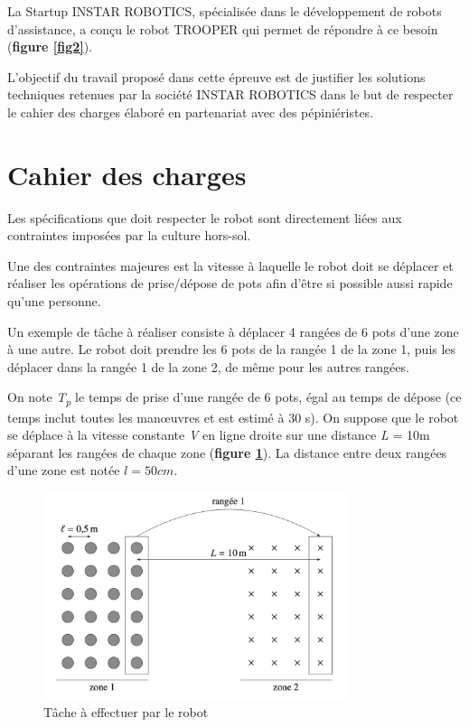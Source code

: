 La Startup INSTAR ROBOTICS, spécialisée dans le développement de robots
d'assistance, a conçu le robot TROOPER qui permet de répondre à ce
besoin (\textbf{figure \ref{fig2}}).

L'objectif du travail proposé dans cette épreuve est de justifier les
solutions techniques retenues par la société INSTAR ROBOTICS dans le but
de respecter le cahier des charges élaboré en partenariat avec des
pépiniéristes.

\section{Cahier des charges}\label{partie-ii---cahier-des-charges}


Les spécifications que doit respecter le robot sont directement liées
aux contraintes imposées par la culture hors-sol.

Une des contraintes majeures est la vitesse à laquelle le robot doit se
déplacer et réaliser les opérations de prise/dépose de pots afin d'être
si possible aussi rapide qu'une personne.

Un exemple de tâche à réaliser consiste à déplacer 4 rangées de 6 pots
d'une zone à une autre. Le robot doit prendre les 6 pots de la rangée 1
de la zone 1, puis les déplacer dans la rangée 1 de la zone 2, de même
pour les autres rangées.

On note \emph{T\textsubscript{p}} le temps de prise d'une rangée de 6
pots, égal au temps de dépose (ce temps inclut toutes les manœuvres et
est estimé à 30 s). On suppose que le robot se déplace à la vitesse
constante \emph{V} en ligne droite sur une distance \emph{L} = 10m
séparant les rangées de chaque zone (\textbf{figure \ref{fig3}}). La distance
entre deux rangées d'une zone est notée $l = 50cm$.


\begin{figure}[!htb]
\begin{center}
\includegraphics[width=0.8\textwidth]{images/fig3.jpg}
\caption{Tâche à effectuer par le robot  \label{fig3}}
\end{center}
\end{figure}


